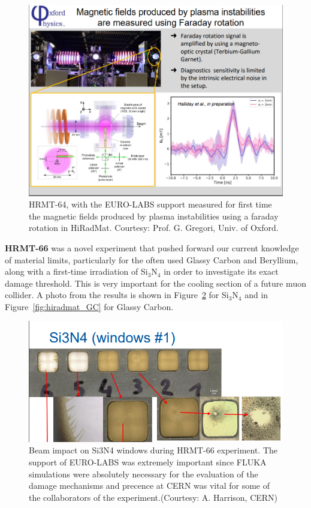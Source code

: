 \begin{figure}[!h]
    \centering
    \includegraphics[width=0.75\linewidth]{graphics/HRMT_64_magnetic_field.png}
    \caption{HRMT-64, with the EURO-LABS support measured for first time the magnetic fields produced by plasma instabilities using a faraday rotation in HiRadMat. Courtesy: Prof. G. Gregori, Univ. of Oxford.}
    \label{fig:hiradmat_mag_field_plasma}
\end{figure}

\textbf{HRMT-66} was a novel experiment that pushed forward our current knowledge of material limits, particularly for the often used Glassy Carbon and Beryllium, along with a first-time irradiation of Si$_{3}$N$_{4}$ in order to investigate its exact damage threshold. This is very important for the cooling section of a future muon collider. A photo from the results is shown in Figure~\ref{fig:hiradmat_Si3N4} for Si$_{3}$N$_{4}$ and in Figure~\ref{fig:hiradmat_GC} for Glassy Carbon. 

\begin{figure}[!h]
    \centering
    \includegraphics[width=0.75\linewidth]{graphics/hiradmat_si3n4.png}
    \caption{Beam impact on Si3N4 windows during HRMT-66 experiment. The support of EURO-LABS was extremely important since FLUKA simulations were absolutely necessary for the evaluation of the damage mechanisms and precence at CERN was vital for some of the collaborators of the experiment.(Courtesy: A. Harrison, CERN)}
    \label{fig:hiradmat_Si3N4}
\end{figure}

